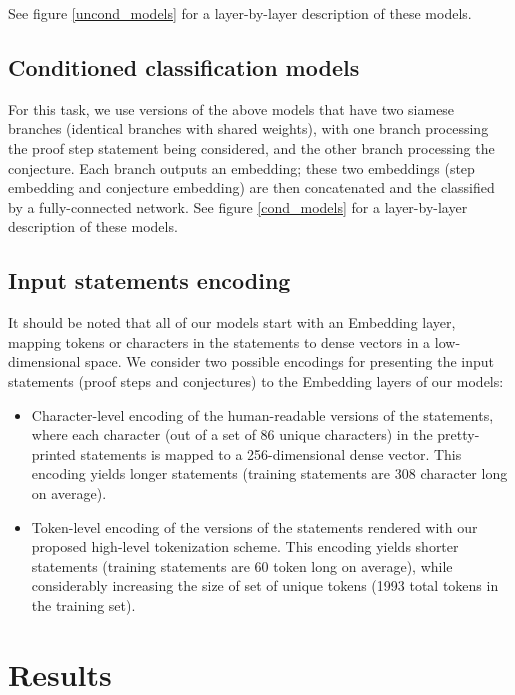 \documentclass[]{article}
\begin{document}
See figure \ref{uncond_models} for a layer-by-layer description of these models.

\subsection{Conditioned classification models}


For this task, we use versions of the above models that have two siamese
branches (identical branches with shared weights), with one branch
processing the proof step statement being considered, and the other
branch processing the conjecture. Each branch outputs an embedding;
these two embeddings (step embedding and conjecture embedding) are then
concatenated and the classified by a fully-connected network.
See figure \ref{cond_models} for a layer-by-layer description of these models.

\subsection{Input statements encoding}

It should be noted that all of our models start with an Embedding layer,
mapping tokens or characters in the statements to dense vectors in a
low-dimensional space. We consider two possible encodings for presenting
the input statements (proof steps and conjectures) to the Embedding
layers of our models:

\begin{itemize}
\item
  Character-level encoding of the human-readable versions of the
  statements, where each character (out of a set of 86 unique
  characters) in the pretty-printed statements is mapped to a
  256-dimensional dense vector. This encoding yields longer statements
  (training statements are 308 character long on average).
\item
  Token-level encoding of the versions of the statements rendered with
  our proposed high-level tokenization scheme. This encoding yields
  shorter statements (training statements are 60 token long on average),
  while considerably increasing the size of set of unique tokens
  (1993 total tokens in the training set).
\end{itemize}

\section{Results}\label{s:results}
\end{document}
